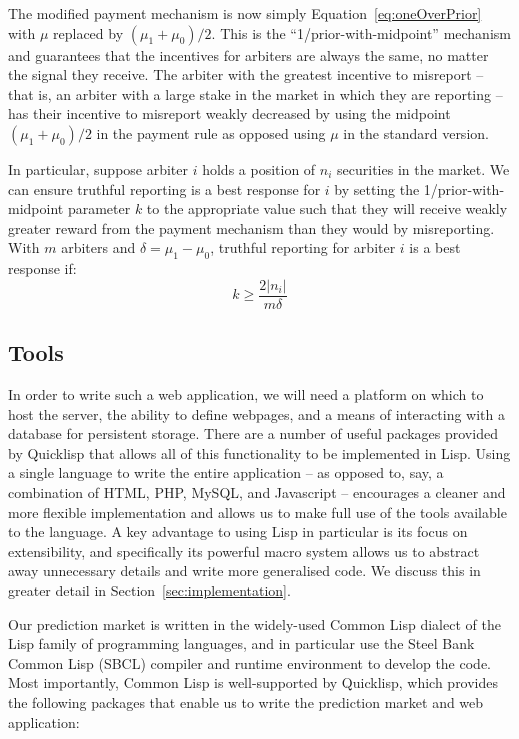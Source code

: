 The modified payment mechanism is now simply Equation~\ref{eq:oneOverPrior}
with $\mu$ replaced by $(\mu_1 + \mu_0)/2$. This is the
``1/prior-with-midpoint'' mechanism and guarantees that the incentives for
arbiters are always the same, no matter the signal they receive. The arbiter
with the greatest incentive to misreport -- that is, an arbiter with a large
stake in the market in which they are reporting -- has their incentive to
misreport weakly decreased by using the midpoint $(\mu_1 + \mu_0)/2$ in the
payment rule as opposed using $\mu$ in the standard version.

In particular, suppose arbiter $i$ holds a position of $n_i$ securities in the
market. We can ensure truthful reporting is a best response for $i$ by setting
the 1/prior-with-midpoint parameter $k$ to the appropriate value such that they
will receive weakly greater reward from the payment mechanism than they would
by misreporting. With $m$ arbiters and $\delta = \mu_1 - \mu_0$, truthful
reporting for arbiter $i$ is a best response if:
%
\begin{equation}
	\label{eq:kBoundN}
	k \ge \frac{2 |n_i|}{m \delta}
\end{equation}

\subsection{Tools}

In order to write such a web application, we will need a platform on which to
host the server, the ability to define webpages, and a means of interacting
with a database for persistent storage. There are a number of useful packages
provided by Quicklisp that allows all of this functionality to be implemented
in Lisp. Using a single language to write the entire application -- as opposed
to, say, a combination of HTML, PHP, MySQL, and Javascript -- encourages a
cleaner and more flexible implementation and allows us to make full use of the
tools available to the language. A key advantage to using Lisp in particular is
its focus on extensibility, and specifically its powerful macro system allows
us to abstract away unnecessary details and write more generalised code. We
discuss this in greater detail in Section~\ref{sec:implementation}.

Our prediction market is written in the widely-used Common Lisp dialect of the
Lisp family of programming languages, and in particular use the Steel Bank
Common Lisp (SBCL) compiler and runtime environment to develop the code. Most
importantly, Common Lisp is well-supported by Quicklisp, which provides the
following packages that enable us to write the prediction market and web
application:

